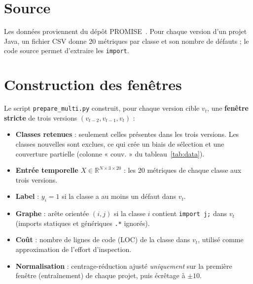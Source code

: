\documentclass[11pt,a4paper,openany]{report}
\newcommand{\code}[1]{\texttt{\small #1}}
\begin{document}
\section{Source}
Les données proviennent du dépôt PROMISE~\cite{jureczko2010}. Pour chaque version d'un projet Java, un fichier CSV
donne 20 métriques par classe et son nombre de défauts ; le code source permet d'extraire les \code{import}.

\section{Construction des fenêtres}
Le script \code{prepare\_multi.py} construit, pour chaque version cible $v_t$, une \textbf{fenêtre stricte} de trois
versions $(v_{t-2},v_{t-1},v_t)$ :
\begin{itemize}
  \item \textbf{Classes retenues} : seulement celles présentes dans les trois versions. Les classes nouvelles sont
        exclues, ce qui crée un biais de sélection et une couverture partielle (colonne « couv. » du
        tableau~\ref{tab:data}).
  \item \textbf{Entrée temporelle} $X\in\mathbb{R}^{N\times 3\times 20}$ : les 20 métriques de chaque classe aux trois
        versions.
  \item \textbf{Label} : $y_i=1$ si la classe a au moins un défaut dans $v_t$.
  \item \textbf{Graphe} : arête orientée $(i,j)$ si la classe $i$ contient \code{import j;} dans $v_t$ (imports
        statiques et génériques \code{.*} ignorés).
  \item \textbf{Coût} : nombre de lignes de code (LOC) de la classe dans $v_t$, utilisé comme approximation de l'effort
        d'inspection.
  \item \textbf{Normalisation} : centrage-réduction ajusté \emph{uniquement} sur la première fenêtre (entraînement) de
        chaque projet, puis écrêtage à $\pm10$.
\end{itemize}
\end{document}
